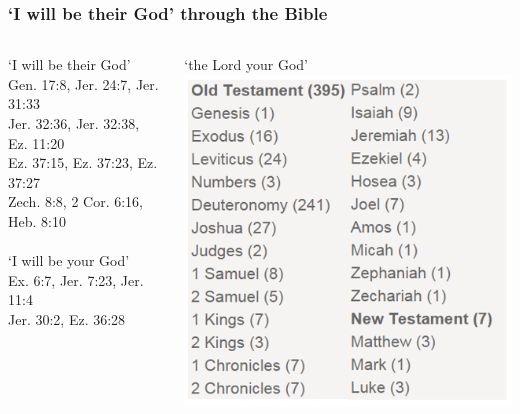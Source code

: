 \begin{frame}
\frametitle{`I will be their God' through the Bible}
\begin{columns}[T]
	\begin{column}{0.45\textwidth}
		`I will be their God'\\{\footnotesize Gen. 17:8, Jer. 24:7, Jer. 31:33\\Jer. 32:36, Jer. 32:38, Ez. 11:20\\Ez. 37:15, Ez. 37:23, Ez. 37:27\\Zech. 8:8, 2 Cor. 6:16, Heb. 8:10}\\~\\
		`I will be your God'\\{\footnotesize Ex. 6:7, Jer. 7:23, Jer. 11:4\\Jer. 30:2, Ez. 36:28}\\~\\
	\end{column}
	\begin{column}{0.55\textwidth}
			`the Lord your God'\\ 
			\includegraphics[width=1\columnwidth]{figures/theLordYourGodTwoColumn.png}
	\end{column}
\end{columns}

\end{frame}

